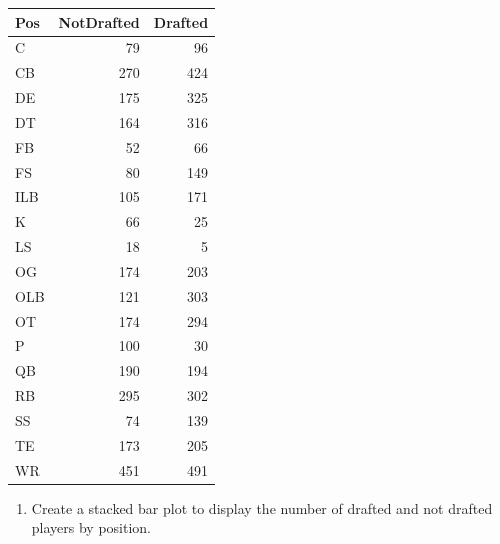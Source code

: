 \documentclass[
  11pt,
]{book}
\newenvironment{Shaded}{\begin{snugshade}}{\end{snugshade}}
\newcommand{\AttributeTok}[1]{\textcolor[rgb]{0.77,0.63,0.00}{#1}}
\newcommand{\FunctionTok}[1]{\textcolor[rgb]{0.00,0.00,0.00}{#1}}
\newcommand{\NormalTok}[1]{#1}
\newcommand{\OtherTok}[1]{\textcolor[rgb]{0.56,0.35,0.01}{#1}}
\newcommand{\SpecialCharTok}[1]{\textcolor[rgb]{0.00,0.00,0.00}{#1}}
\newcommand{\StringTok}[1]{\textcolor[rgb]{0.31,0.60,0.02}{#1}}
\providecommand{\tightlist}{%
  \setlength{\itemsep}{0pt}\setlength{\parskip}{0pt}}
\theoremstyle{definition}
\theoremstyle{definition}
\theoremstyle{definition}
\theoremstyle{definition}
\theoremstyle{remark}
\begin{document}
\begin{tabular}{lrr}
\toprule
Pos & NotDrafted & Drafted\\
\midrule
C & 79 & 96\\
CB & 270 & 424\\
DE & 175 & 325\\
DT & 164 & 316\\
FB & 52 & 66\\
\addlinespace
FS & 80 & 149\\
ILB & 105 & 171\\
K & 66 & 25\\
LS & 18 & 5\\
OG & 174 & 203\\
\addlinespace
OLB & 121 & 303\\
OT & 174 & 294\\
P & 100 & 30\\
QB & 190 & 194\\
RB & 295 & 302\\
\addlinespace
SS & 74 & 139\\
TE & 173 & 205\\
WR & 451 & 491\\
\bottomrule
\end{tabular}

\newpage

\begin{enumerate}
\def\labelenumi{(\alph{enumi})}
\setcounter{enumi}{3}
\tightlist
\item
  Create a stacked bar plot to display the number of drafted and not drafted players by position.
\end{enumerate}

\begin{Shaded}
\end{Shaded}
\end{document}
